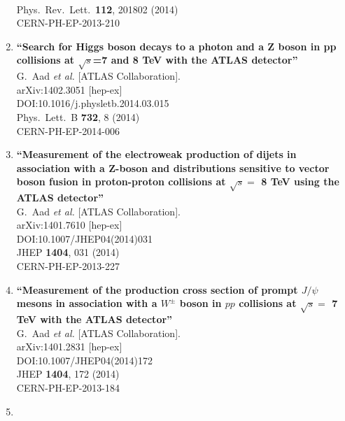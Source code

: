 \documentclass{article}
\begin{document}
\begin{enumerate}
  \\{}Phys.\ Rev.\ Lett.\  {\bf 112}, 201802 (2014)
  \\{}CERN-PH-EP-2013-210
\item%
{\bf ``Search for Higgs boson decays to a photon and a Z boson in pp collisions at $\sqrt{s}$=7 and 8 TeV with the ATLAS detector''}
  \\{}G.~Aad {\it et al.} [ATLAS Collaboration].
  \\{}arXiv:1402.3051 [hep-ex]
  \\{}DOI:10.1016/j.physletb.2014.03.015
  \\{}Phys.\ Lett.\ B {\bf 732}, 8 (2014)
  \\{}CERN-PH-EP-2014-006
\item%
{\bf ``Measurement of the electroweak production of dijets in association with a Z-boson and distributions sensitive to vector boson fusion in proton-proton collisions at $\sqrt{s} =$ 8 TeV using the ATLAS detector''}
  \\{}G.~Aad {\it et al.} [ATLAS Collaboration].
  \\{}arXiv:1401.7610 [hep-ex]
  \\{}DOI:10.1007/JHEP04(2014)031
  \\{}JHEP {\bf 1404}, 031 (2014)
  \\{}CERN-PH-EP-2013-227
\item%
{\bf ``Measurement of the production cross section of prompt $J/\psi$ mesons in association with a $W^\pm$ boson in $pp$ collisions at $\sqrt{s} =$ 7 TeV with the ATLAS detector''}
  \\{}G.~Aad {\it et al.} [ATLAS Collaboration].
  \\{}arXiv:1401.2831 [hep-ex]
  \\{}DOI:10.1007/JHEP04(2014)172
  \\{}JHEP {\bf 1404}, 172 (2014)
  \\{}CERN-PH-EP-2013-184
\item%

\end{enumerate}
\end{document}
